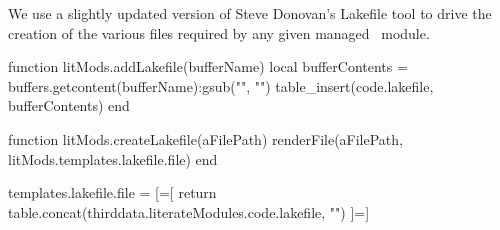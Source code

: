 
\startchapter[title=Lakefile]

We use a slightly updated version of Steve Donovan's Lakefile tool to 
drive the creation of the various files required by any given 
 managed \ConTeXt\ module. 

\startMkIVCode



\setuptyping[Lakefile][option=lua]


\let\oldStopLakefile=\stopLakefile
\def\stopLakefile{%
  \oldStopLakefile%
  \directlua{thirddata.literateModules.addLakefile('_typing_')}}


\def\createLakefile[#1]{
  \directlua{thirddata.literateModules.createLakefile('#1')}
}

\stopMkIVCode

\startLuaCode

function litMods.addLakefile(bufferName)
  local bufferContents = buffers.getcontent(bufferName):gsub("", "\n")
  table_insert(code.lakefile, bufferContents)
end

function litMods.createLakefile(aFilePath)
  renderFile(aFilePath, litMods.templates.lakefile.file)
end

\stopLuaCode

\startLuaTemplate

templates.lakefile.file = [=[
{{ return table.concat(thirddata.literateModules.code.lakefile, "\n\n") }}
]=]

\stopLuaTemplate

